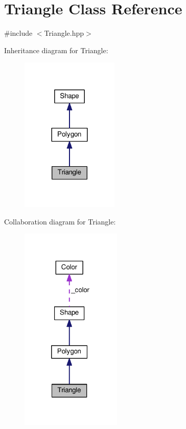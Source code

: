 \hypertarget{class_triangle}{}\section{Triangle Class Reference}
\label{class_triangle}


{\ttfamily \#include $<$Triangle.\+hpp$>$}



Inheritance diagram for Triangle\+:\nopagebreak
\begin{figure}[H]
\begin{center}
\leavevmode
\includegraphics[width=132pt]{class_triangle__inherit__graph}
\end{center}
\end{figure}


Collaboration diagram for Triangle\+:\nopagebreak
\begin{figure}[H]
\begin{center}
\leavevmode
\includegraphics[width=136pt]{class_triangle__coll__graph}
\end{center}
\end{figure}
